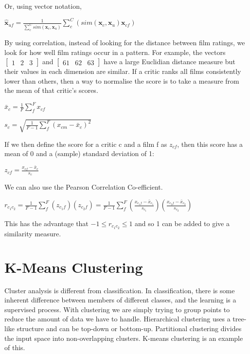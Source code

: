 \documentclass[10pt,a4paper]{article}
\newcommand{\bh}[1]{\bm{\hat{#1}}}
\newcommand{\su}[2]{\sum\limits_{#1}^{#2}}
\newcommand{\re}[1]{\frac{1}{#1}}
\begin{document}
			 Or, using vector notation,
			 
			 \begin{center}
			 	$\bh x_{uf} = \frac{1}{\sum\limits_c^C sim(\bm x_c, \bm x_u)}\sum\limits_c^C(sim(\bm x_c, \bm x_u)\bm x_{cf})	$
			 \end{center}
			 
			 By using correlation, instead of looking for the distance between film ratings, we look for how well film ratings occur in a pattern. For example, the vectors $\begin{bmatrix} 1 & 2 & 3 \end{bmatrix}$ and $\begin{bmatrix} 61 & 62 & 63 \end{bmatrix}$ have a large Euclidian distance measure but their values in each dimension are similar. If a critic ranks all films consistently lower than others, then a way to normalise the score is to take a measure from the mean of that critic's scores.
			 
			 \begin{center}
			 	$
				 	\bar x_c = \frac{1}{F}\sum\limits_f^F x_{cf}
				 	$
				 	
				 	$
				 	s_c = \sqrt{\frac{1}{F - 1}\sum\limits_f^F (x_{cm} - \bar x_c)^2}
			 	$
			 \end{center}
			 
			 If we then define the score for a critic c and a film f as $z_{cf}$, then this score has a mean of 0 and a (sample) standard deviation of 1:
			 
			 \begin{center}
			 	$ z_{cf} = \frac{x_{cf} - \bar x_c}{s_c} $
			 \end{center}
			 
			 We can also use the Pearson Correlation Co-efficient. 
			 
			 \begin{center}
			 	$
				 	r_{c_1c_2} = \re{F-1}\su{f}{F}(z_{c_1f})(z_{c_2f})
				 	= \re{F-1}\su{f}{F}(\frac{x_{c_1f} - \bar x_{c_1}}{s_{c_1}})(\frac{x_{c_2f} - \bar x_{c_2}}{s_{c_2}})
			 	$
			 \end{center}
			 
			 
			 This has the advantage that $-1 \leq r_{c_1c_2} \leq 1$ and so 1 can be added to give a similarity measure.
			
	\section{K-Means Clustering}
		Cluster analysis is different from classification. In classification, there is some inherent difference between members of different classes, and the learning is a supervised process. With clustering we are simply trying to group points to reduce the amount of data we have to handle. Hierarchical clustering uses a tree-like structure and can be top-down or bottom-up. Partitional clustering divides the input space into non-overlapping clusters. K-means clustering is an example of this.
		
\end{document}
